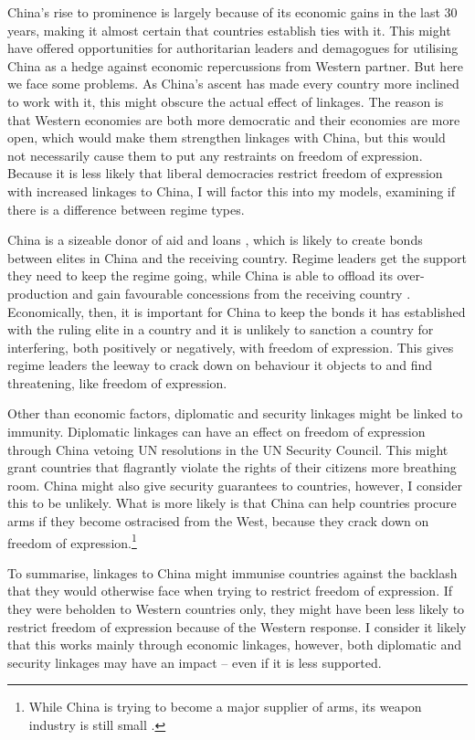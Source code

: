 China's rise to prominence is largely because of its economic gains in the last 30 years, making it almost certain that countries establish ties with it. This might have offered opportunities for authoritarian leaders and demagogues for utilising China as a hedge against economic repercussions from Western partner. But here we face some problems. As China's ascent has made every country more inclined to work with it, this might obscure the actual effect of linkages. The reason is that Western economies are both more democratic and their economies are more open, which would make them strengthen linkages with China, but this would not necessarily cause them to put any restraints on freedom of expression. Because it is less likely that liberal democracies restrict freedom of expression with increased linkages to China, I will factor this into my models, examining if there is a difference between regime types.

China is a sizeable donor of aid and loans \citep{fuchs_why_2022}, which is likely to create bonds between elites in China and the receiving country. Regime leaders get the support they need to keep the regime going, while China is able to offload its over-production and gain favourable concessions from the receiving country \citep{fuchs_why_2022}. Economically, then, it is important for China to keep the bonds it has established with the ruling elite in a country and it is unlikely to sanction a country for interfering, both positively or negatively, with freedom of expression. This gives regime leaders the leeway to crack down on behaviour it objects to and find threatening, like freedom of expression.

Other than economic factors, diplomatic and security linkages might be linked to immunity. Diplomatic linkages can have an effect on freedom of expression through China vetoing UN resolutions in the UN Security Council. This might grant countries that flagrantly violate the rights of their citizens more breathing room. China might also give security guarantees to countries, however, I consider this to be unlikely. What is more likely is that China can help countries procure arms if they become ostracised from the West, because they crack down on freedom of expression\citep{george_trends_2025, gunter_chinas_2024}.\footnote{While China is trying to become a major supplier of arms, its weapon industry is still small \citep{gunter_chinas_2024}.}

To summarise, linkages to China might immunise countries against the backlash that they would otherwise face when trying to restrict freedom of expression. If they were beholden to Western countries only, they might have been less likely to restrict freedom of expression because of the Western response. I consider it likely that this works mainly through economic linkages, however, both diplomatic and security linkages may have an impact -- even if it is less supported.

